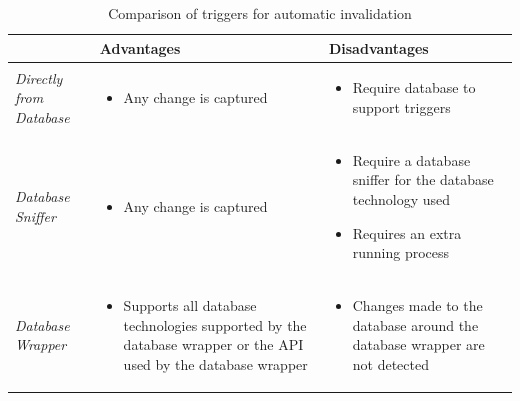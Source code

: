 \begin{table}[ht!]
  \footnotesize
  \centering
  \begin{tabular}{lll}
    \hline
    & \textbf{Advantages} & \textbf{Disadvantages} \\
    \hline
    {
      \emph{Directly from Database}
    } & {
      \parbox{3.5cm}{
        \begin{itemize}[leftmargin=0.75em]
          \item Any change is captured
        \end{itemize}
      }
    } & {
      \parbox{3.5cm}{
        \begin{itemize}[leftmargin=0.75em]
          \item Require database to support triggers
        \end{itemize}
      }
    } \\
    \hline
    {
      \emph{Database Sniffer}
    } & {
      \parbox{3.5cm}{
        \begin{itemize}[leftmargin=0.75em]
          \item Any change is captured
        \end{itemize}
      }
    } & {
      \parbox{3.5cm}{
        \begin{itemize}[leftmargin=0.75em]
          \item Require a database sniffer for the database technology used
          \item Requires an extra running process
        \end{itemize}
      }
    } \\
    \hline
    {
      \emph{Database Wrapper}
    } & {
      \parbox{3.5cm}{
        \begin{itemize}[leftmargin=0.75em]
          \item Supports all database technologies supported by the database wrapper or the API used by the database wrapper
        \end{itemize}
      }
    } & {
      \parbox{3.5cm}{
        \begin{itemize}[leftmargin=0.75em]
          \item Changes made to the database around the database wrapper are not detected
        \end{itemize}
      }
    } \\
    \hline
  \end{tabular}
  \caption{Comparison of triggers for automatic invalidation}
  \label{fig:invalidation-trigger-comparison}
\end{table}

